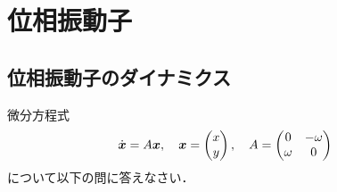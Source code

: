 \documentclass[twocolumn,11pt]{jarticle}
\begin{document}
\section{位相振動子}

\subsection{位相振動子のダイナミクス}
\question
微分方程式
\begin{align}
\label{eq:harm-osc}
\dot{\boldsymbol{x}}&=A\boldsymbol{x},\quad
\boldsymbol{x}=
\begin{pmatrix}
x\\y  
\end{pmatrix},\quad
A=
\begin{pmatrix}
0 & -\omega \\
\omega & 0
\end{pmatrix}
\end{align}
について以下の問に答えなさい．
\end{document}
